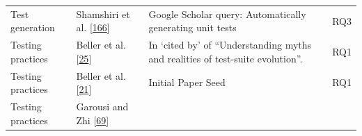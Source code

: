 \documentclass[]{book}
\begin{document}
\begin{longtable}[]{@{}llll@{}}
\begin{minipage}[t]{0.18\columnwidth}
Test generation\strut
\end{minipage} & \begin{minipage}[t]{0.16\columnwidth}\raggedright\strut
Shamshiri et al.
{[}\protect\hyperlink{ref-shamshiri2018automatically}{166}{]}\strut
\end{minipage} & \begin{minipage}[t]{0.50\columnwidth}\raggedright\strut
Google Scholar query: Automatically generating unit tests\strut
\end{minipage} & \begin{minipage}[t]{0.04\columnwidth}\raggedright\strut
RQ3\strut
\end{minipage}\tabularnewline
\begin{minipage}[t]{0.18\columnwidth}\raggedright\strut
Testing practices\strut
\end{minipage} & \begin{minipage}[t]{0.16\columnwidth}\raggedright\strut
Beller et al. {[}\protect\hyperlink{ref-beller2015}{25}{]}\strut
\end{minipage} & \begin{minipage}[t]{0.50\columnwidth}\raggedright\strut
In `cited by' of ``Understanding myths and realities of test-suite
evolution''.\strut
\end{minipage} & \begin{minipage}[t]{0.04\columnwidth}\raggedright\strut
RQ1\strut
\end{minipage}\tabularnewline
\begin{minipage}[t]{0.18\columnwidth}\raggedright\strut
Testing practices\strut
\end{minipage} & \begin{minipage}[t]{0.16\columnwidth}\raggedright\strut
Beller et al.
{[}\protect\hyperlink{ref-beller2017developer}{21}{]}\strut
\end{minipage} & \begin{minipage}[t]{0.50\columnwidth}\raggedright\strut
Initial Paper Seed\strut
\end{minipage} & \begin{minipage}[t]{0.04\columnwidth}\raggedright\strut
RQ1\strut
\end{minipage}\tabularnewline
\begin{minipage}[t]{0.18\columnwidth}\raggedright\strut
Testing practices\strut
\end{minipage} & \begin{minipage}[t]{0.16\columnwidth}\raggedright\strut
Garousi and Zhi {[}\protect\hyperlink{ref-GAROUSI20131354}{69}{]}\strut

\end{minipage}
\end{longtable}
\end{document}
